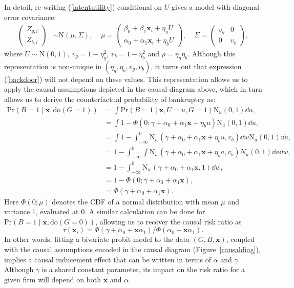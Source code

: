 \documentclass[aoas,preprint, 11pt, dvipsnames, table, x11name]{imsart}
\newcommand{\N}{\mbox{N}}
\theoremstyle{remark}
\begin{document}
	In detail, re-writing (\ref{latentutility}) conditional on $U$ gives a model with diagonal error covariance:
	\begin{equation}
		\begin{split}
			\begin{pmatrix}
				Z_{g,i} \\ Z_{b,i}
			\end{pmatrix} &\sim \mbox{N}(\mu, \Sigma), \;\;\;\; 
			\mu  = \begin{pmatrix}
				\beta_{0} + \beta_{1}\mathbf{x}_i + \eta_g U  \\
				\alpha_{0} + \alpha_{1}\mathbf{x}_{i}  + \eta_b U
			\end{pmatrix},  \;\;\;\;  \Sigma = \begin{pmatrix} v_g & 0 \\ 0 & v_b \end{pmatrix},
		\end{split}
	\end{equation}
	where $U \sim \mbox{N}(0, 1)$, $v_g = 1 - \eta_g^2$, $v_b = 1 - \eta_b^2$ and $\rho = \eta_g \eta_b$.  Although this representation is non-unique in $(\eta_g, \eta_b, v_g, v_b)$, it turns out that expression (\ref{backdoor}) will not depend on these values.  This representation allows us to apply the causal assumptions depicted in the causal diagram above, which in turn allows us to derive the counterfactual probability of bankruptcy as:
	\begin{equation}
		\begin{split}
			\mbox{Pr}(B = 1 \mid \mathbf{x}, \text{do}(G = 1)) &=  \int  \mbox{Pr}(B = 1 \mid \mathbf{x}, U=u, G = 1) \N_u(0,1) \dd u,\\
			& = \int  1 - \Phi(0; \gamma + \alpha_0 + \alpha_1 \mathbf{x} + \eta_b u) \N_u(0,1) \dd u,\\
			& = \int 1 - \int_{-\infty}^0 \N_w(\gamma + \alpha_0 + \alpha_1 \mathbf{x} + \eta_b u, v_b) \dd w \N_u(0,1) \dd u,\\
			& = 1 - \int_{-\infty}^0 \int \N_w(\gamma + \alpha_0 + \alpha_1 \mathbf{x} + \eta_b a, v_b)  N_u(0,1) \dd a \dd w,\\
			& = 1 - \int_{-\infty}^0 \N_w(\gamma + \alpha_0 + \alpha_1 \mathbf{x}, 1) \dd w,\\
			& = 1 - \Phi(0; \gamma + \alpha_0 + \alpha_1 \mathbf{x}),\\ 
			&= \Phi(\gamma + \alpha_0 + \alpha_1 \mathbf{x}).
		\end{split}
	\end{equation}
	Here $\Phi(0; \mu)$ denotes the CDF of a normal distribution with mean $\mu$ and variance 1, evaluated at 0.  A similar calculation can be done for $\mbox{Pr}(B = 1 \mid \mathbf{x}, \text{do}(G = 0))$, allowing us to recover the causal risk ratio as $$\tau(\mathbf{x}_i) = \Phi(\gamma + \alpha_0 + \mathbf{x}\alpha_1) /\Phi(\alpha_0 + \mathbf{x}\alpha_1).$$  In other words, fitting a bivariate probit model to the data $(G, B, \mathbf{x})$, coupled with the causal assumptions encoded in the causal diagram (Figure~\ref{causaldiag}), implies a causal inducement effect that can be written in terms of $\alpha$ and $\gamma$. Although $\gamma$ is a shared constant parameter, its impact on the risk ratio for a given firm will depend on both $\mathbf{x}$ and $\alpha$. 
	
\end{document}
